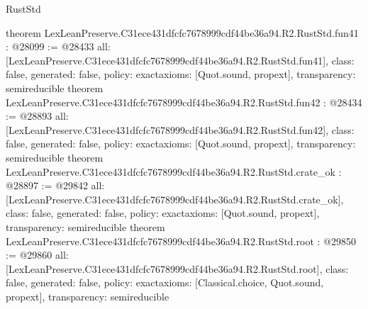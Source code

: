 \begin{lexlean}{RustStd}
\begin{coremodule}
{}
theorem LexLeanPreserve.C31ece431dfcfc7678999cdf44be36a94.R2.RustStd.fun41 : @28099 := @28433 {
  all: [LexLeanPreserve.C31ece431dfcfc7678999cdf44be36a94.R2.RustStd.fun41],
  class: false,
  generated: false,
  policy: exact{axioms: [Quot.sound, propext]},
  transparency: semireducible
}
theorem LexLeanPreserve.C31ece431dfcfc7678999cdf44be36a94.R2.RustStd.fun42 : @28434 := @28893 {
  all: [LexLeanPreserve.C31ece431dfcfc7678999cdf44be36a94.R2.RustStd.fun42],
  class: false,
  generated: false,
  policy: exact{axioms: [Quot.sound, propext]},
  transparency: semireducible
}
theorem LexLeanPreserve.C31ece431dfcfc7678999cdf44be36a94.R2.RustStd.crate_ok : @28897 := @29842 {
  all: [LexLeanPreserve.C31ece431dfcfc7678999cdf44be36a94.R2.RustStd.crate_ok],
  class: false,
  generated: false,
  policy: exact{axioms: [Quot.sound, propext]},
  transparency: semireducible
}
theorem LexLeanPreserve.C31ece431dfcfc7678999cdf44be36a94.R2.RustStd.root : @29850 := @29860 {
  all: [LexLeanPreserve.C31ece431dfcfc7678999cdf44be36a94.R2.RustStd.root],
  class: false,
  generated: false,
  policy: exact{axioms: [Classical.choice, Quot.sound, propext]},
  transparency: semireducible
}


\end{coremodule}
\end{lexlean}
